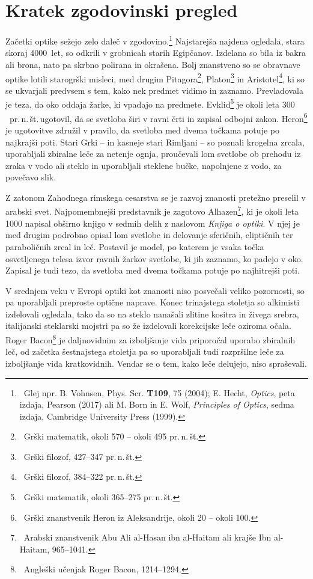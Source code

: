 \section{Kratek zgodovinski pregled}
Začetki optike sežejo zelo daleč v zgodovino.\footnote{~Glej 
npr. B. Vohnsen, Phys. Scr. {\bf T109}, 75 (2004); 
E. Hecht, {\it Optics}, peta izdaja, Pearson (2017) ali
M. Born in E. Wolf, {\it Principles of Optics}, sedma izdaja, 
Cambridge University Press (1999).} Najstarejša najdena ogledala, 
stara skoraj 4000~let, so odkrili v grobnicah starih Egipčanov. 
Izdelana so bila iz bakra ali brona, nato pa skrbno polirana in okrašena. 
Bolj znanstveno so se obravnave optike lotili starogrški
misleci, med drugim Pitagora\footnote{~Grški 
matematik, okoli 570 -- okoli 495 pr.\,n.\,št.}, Platon\footnote{~Grški 
filozof, 427--347 pr.\,n.\,št.} in Aristotel\footnote{~Grški 
filozof, 384--322 pr.\,n.\,št.}, ki so se
ukvarjali predvsem s tem, kako nek predmet vidimo in zaznamo. Prevladovala
je teza, da oko oddaja žarke, ki vpadajo na predmete.
Evklid\footnote{~Grški 
matematik, okoli 365--275 pr.\,n.\,št.}  je okoli leta $300$~pr.\,n.\,št.\,ugotovil, 
da se svetloba širi v ravni črti in zapisal odbojni zakon. Heron\footnote{~Grški 
znanstvenik Heron iz Aleksandrije, okoli 20 -- okoli 100.} je ugotovitve združil
v pravilo, da svetloba med dvema točkama potuje po najkrajši poti.
Stari Grki -- in kasneje stari Rimljani -- so poznali krogelna zrcala, 
uporabljali zbiralne leče za netenje ognja, 
proučevali lom svetlobe ob prehodu iz zraka v vodo ali steklo
in uporabljali steklene bučke, napolnjene z vodo, za povečavo slik.

Z zatonom Zahodnega rimskega cesarstva se je razvoj znanosti pretežno 
preselil v arabski svet. Najpomembnejši predstavnik je zagotovo 
Alhazen\footnote{~Arabski znanstvenik Abu 
Ali al-Hasan ibn al-Haitam ali krajše Ibn al-Haitam, 965--1041.}, 
ki je okoli leta 1000 napisal obširno knjigo v sedmih delih
z naslovom {\it Knjiga o optiki}. 
V njej je med drugim podrobno opisal lom svetlobe in delovanje sferičnih,
eliptičnih ter paraboličnih zrcal in leč. Postavil je model, 
po katerem je vsaka točka osvetljenega telesa izvor
ravnih žarkov svetlobe, ki jih zaznamo, ko padejo v oko. 
Zapisal je tudi tezo, da svetloba med dvema točkama potuje po najhitrejši poti.

V srednjem veku v Evropi optiki kot znanosti niso posvečali veliko
pozornosti, so pa uporabljali preproste optične naprave. 
Konec trinajstega stoletja so alkimisti izdelovali ogledala, 
tako da so na steklo nanašali zlitine kositra in živega srebra, 
italijanski steklarski mojstri pa so že izdelovali korekcijske leče 
oziroma očala. Roger Bacon\footnote{~Angleški učenjak Roger Bacon, 1214--1294.}
je daljnovidnim za izboljšanje vida priporočal uporabo zbiralnih leč, 
od začetka šestnajstega stoletja pa so uporabljali tudi razpršilne leče
za izboljšanje vida kratkovidnih. Vendar se o tem, kako leče delujejo, 
niso spraševali. 

